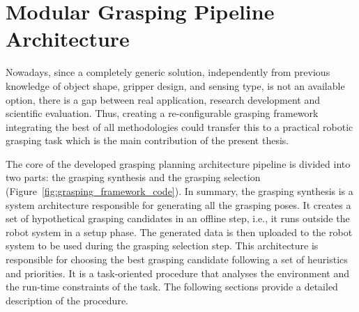 \chapter{Modular Grasping Pipeline Architecture}
\label{cap4:modular_grasping_architecture}

Nowadays, since a completely generic solution, independently from previous knowledge of object shape, gripper design, and sensing type, is not an available option, there is a gap between real application, research development and scientific evaluation. Thus, creating a re-configurable grasping framework integrating the best of all methodologies could transfer this to a practical robotic grasping task which is the main contribution of the present thesis.

The core of the developed grasping planning architecture pipeline is divided into two parts: the grasping synthesis and the grasping selection (Figure~\ref{fig:grasping_framework_code}). In summary, the grasping synthesis is a system architecture responsible for generating all the grasping poses. It creates a set of  hypothetical grasping candidates in an offline step, i.e., it runs outside the robot system in a setup phase. The generated data is then uploaded to the robot system to be used during the grasping selection step. This architecture is responsible for choosing the best grasping candidate following a set of heuristics and priorities. It is a task-oriented procedure that analyses the environment and the run-time constraints of the task. The following sections provide a detailed description of the procedure.

